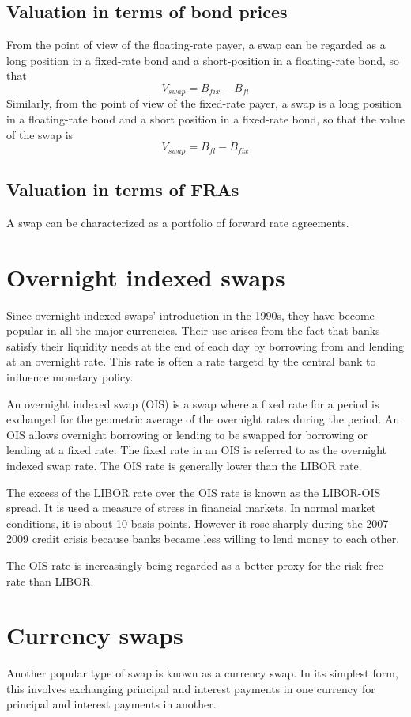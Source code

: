 \documentclass{article}
\begin{document}
\subsection{Valuation in terms of bond prices}
From the point of view of the floating-rate payer, a swap can be regarded as a long position in a fixed-rate bond and a short-position in a floating-rate bond, so that
\[
V_{swap}=B_{fix}-B_{fl}
\]
Similarly, from the point of view of the fixed-rate payer, a swap is a long position in a floating-rate bond and a short position in a fixed-rate bond, so that the value of the swap is
\[
V_{swap}=B_{fl}-B_{fix}
\]

\subsection{Valuation in terms of FRAs}
A swap can be characterized as a portfolio of forward rate agreements.	

\section{Overnight indexed swaps}
Since overnight indexed swaps' introduction in the 1990s, they have become popular in all the major currencies. Their use arises from the fact that banks satisfy their liquidity needs at the end of each day by borrowing from and lending at an overnight rate. This rate is often a rate targetd by the central bank to influence monetary policy.

An overnight indexed swap (OIS)  is a swap where a fixed rate for a period is exchanged for the geometric average of the overnight rates during the period. An OIS allows overnight borrowing or lending to be swapped for borrowing or lending at a fixed rate. The fixed rate in an OIS is referred to as the overnight indexed swap rate. The OIS rate is generally lower than the LIBOR rate.

The excess  of the LIBOR rate over the OIS rate is known as the LIBOR-OIS spread. It is used a measure of stress in financial markets. In normal market conditions, it is about 10 basis points. However it rose sharply during the 2007-2009 credit crisis because banks became less willing to lend money to each other.

The OIS rate is increasingly being regarded as a better proxy for the risk-free rate than LIBOR.

\section{Currency swaps}
Another popular type of swap is known as a currency swap. In its simplest form, this involves exchanging principal and interest payments in one currency for principal and interest payments in another.
\end{document}
